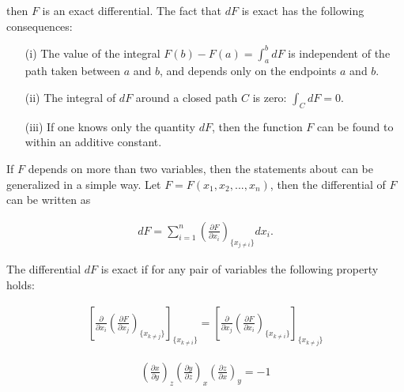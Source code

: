\documentclass{article}
\numberwithin{theorem}{subsection}
\numberwithin{theorem}{subsubsection}
\numberwithin{lemma}{subsection}
\numberwithin{lemma}{subsubsection}
\theoremstyle{definition}
\numberwithin{definition}{subsection}
\numberwithin{definition}{subsubsection}
\begin{document}
\noindent then $F$ is an exact differential. The fact that $dF$ is exact has the following consequences:

\begin{itemize}
    \item[(i)] The value of the integral $F(b) - F(a) = \int_{a}^{b} dF$ is independent of the path taken between $a$ and $b$, and depends only on the endpoints $a$ and $b$.
    \item[(ii)] The integral of $dF$ around a closed path $C$ is zero: $\int_{C} dF = 0.$
    \item[(iii)] If one knows only the quantity $dF$, then the function $F$ can be found to within an additive constant.
\end{itemize}

\indent If $F$ depends on more than two variables, then the statements about can be generalized in a simple way. Let $F = F(x_{1},x_{2},...,x_{n})$, then the differential of $F$ can be written as

\begin{gather*}
    dF = \sum_{i = 1}^{n} \left ( \frac{\partial F}{\partial x_{i}} \right )_{\{x_{j \neq i}\}}dx_{i}.
\end{gather*}

The differential $dF$ is exact if for any pair of variables the following property holds:

\begin{gather*}
    \left [ \frac{\partial}{\partial x_{i}}\left ( \frac{\partial F}{\partial x_{j}} \right )_{\{x_{k \neq j}\}}\right ]_{\{x_{k \neq i}\}} = \left [ \frac{\partial}{\partial x_{j}}\left ( \frac{\partial F}{\partial x_{i}} \right )_{\{x_{k \neq i}\}}\right ]_{\{x_{k \neq j}\}}
\end{gather*}

\begin{gather}
    \left(\frac{\partial x}{\partial y}\right)_{z}\left(\frac{\partial y}{\partial z}\right)_{x}\left(\frac{\partial z}{\partial x}\right)_{y} = -1
\end{gather}

\begin{comment}
======================================================================================================================================================================================================================================================================================DIFFERENTIAL EQUATIONS=================================================== ====================================================================================================================================================================================================================================
\end{comment}
\end{document}
